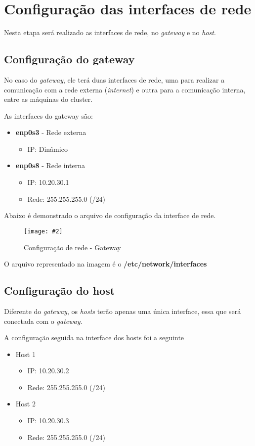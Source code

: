 \documentclass[
	12pt,				%
	openany,			%
	a4paper,			%
	chapter=TITLE,		%
	section=TITLE,		%
	english,
	brazil				%
]{abntex2}
\newcommand{\includeImage}[3] {

\begin{figure}[H]
 	 \centering
  		\texttt{[image: \#2]}
  	\caption{#3}
\end{figure}

}
\begin{document}
\section{Configuração das interfaces de rede}

Nesta etapa será realizado as interfaces de rede, no \textit{gateway} e no \textit{host}.

\subsection{Configuração do gateway}

No caso do \textit{gateway}, ele terá duas interfaces de rede, uma para realizar a comunicação com a rede externa (\textit{internet}) e outra para a comunicação interna, entre as máquinas do cluster.

As interfaces do gateway são:
\begin{itemize}
	\item \textbf{enp0s3} - Rede externa
		\begin{itemize}
			\item IP: Dinâmico
		\end{itemize}
	\item \textbf{enp0s8} - Rede interna
		\begin{itemize}
			\item IP: 10.20.30.1
			\item Rede: 255.255.255.0 (/24)
		\end{itemize}
\end{itemize}

Abaixo é demonstrado o arquivo de configuração da interface de rede.

\includeImage{0.5}{imgs/2_configuracao_rede/gateway/1.png}{Configuração de rede - Gateway}

O arquivo representado na imagem é o \textbf{/etc/network/interfaces}

\subsection{Configuração do host}

Diferente do \textit{gateway}, os \textit{hosts} terão apenas uma única interface, essa que será conectada com o \textit{gateway}.

A configuração seguida na interface dos hosts foi a seguinte
\begin{itemize}
	\item Host 1
		\begin{itemize}
			\item IP: 10.20.30.2
			\item Rede: 255.255.255.0 (/24)
		\end{itemize}
	\item Host 2
		\begin{itemize}
			\item IP: 10.20.30.3
			\item Rede: 255.255.255.0 (/24)
		\end{itemize}
\end{itemize}
\end{document}

